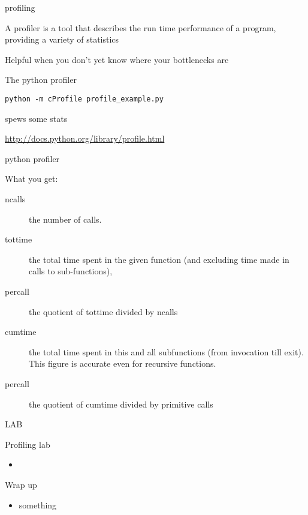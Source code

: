 \documentclass{beamer}
\begin{document}
\begin{frame}[fragile]{profiling}

{\Large A profiler is a tool that describes the run time performance of a
program, providing a variety of statistics}

\vfill
{\Large Helpful when you don't yet know where your bottlenecks are}

\vfill
{\Large The python profiler}

\begin{verbatim}
python -m cProfile profile_example.py  
\end{verbatim}
{\Large spews some stats}


\vfill
\url{http://docs.python.org/library/profile.html}
\end{frame} 

\begin{frame}[fragile]{python profiler}

{\Large What you get:}

\begin{description}
  \item[ncalls] the number of calls.
  \item[tottime] the total time spent in the given function (and excluding time made in calls to sub-functions),
  \item[percall] the quotient of tottime divided by ncalls
  \item[cumtime] the total time spent in this and all subfunctions (from invocation till exit). This figure is accurate even for recursive functions.
  \item[percall] the quotient of cumtime divided by primitive calls
\end{description}

\end{frame} 



\begin{frame}{LAB}

{\Large Profiling lab}

\begin{itemize}
  \item
\end{itemize}

\end{frame}



\begin{frame}{Wrap up}

\begin{itemize}
  \item something
\end{itemize}

\end{frame}
\end{document}

